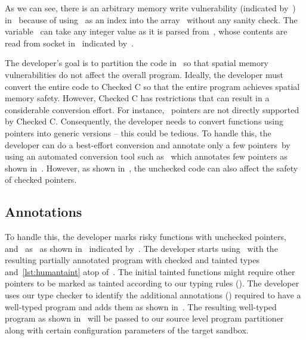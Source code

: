 As we can see, there is an arbitrary memory write vulnerability (indicated by~\realbug) in~ because of using~ as an index into the array~ without any sanity check.
The variable~ can take any integer value as it is parsed from~, whose contents are read from socket in~ indicated by~\rootcause.

The developer's goal is to partition the code in~ so that spatial memory vulnerabilities do not affect the overall program.
Ideally, the developer must convert the entire code to Checked C so that the entire program achieves spatial memory safety.
However, Checked C has restrictions that can result in a considerable conversion effort.
For instance,~ pointers are not directly supported by Checked C.
Consequently, the developer needs to convert functions using~ pointers into generic versions -- this could be tedious.
To handle this, the developer can do a best-effort conversion and annotate only a few pointers~\eg by using an automated conversion tool such as~\threec{} which annotates few pointers as shown in~.
However, as shown in~, the unchecked code can also affect the safety of checked pointers.
\subsection{\systemname Annotations}
\label{subsec:moveregionstosbx}
To handle this, the developer marks risky functions with unchecked pointers,~\ie~ and~ as~ as shown in~ indicated by~\useradded.
The developer starts using~\systemname{} with the resulting partially annotated program with checked and tainted types~\ie~ and~\ref{lst:humantaint} atop of~.
The initial tainted functions might require other pointers to be marked as tainted according to our typing rules ().
The developer uses our type checker to identify the additional annotations (\usermods) required to have a well-typed program and adds them as shown in~.
The resulting well-typed program as shown in~ will be passed to our source level program partitioner along with certain configuration parameters of the target sandbox.

